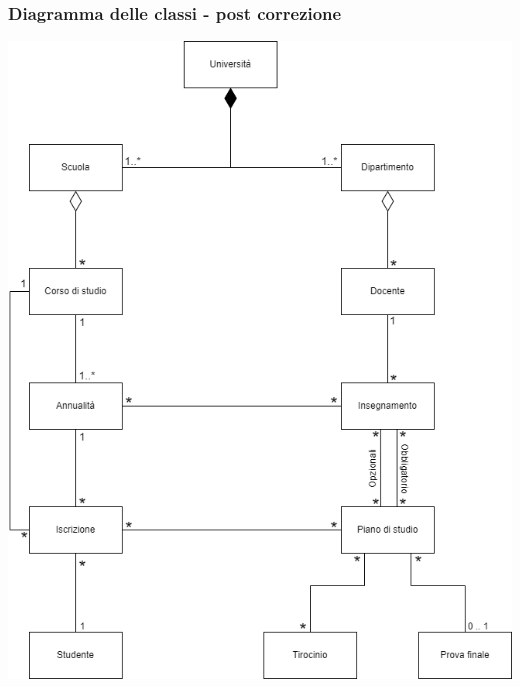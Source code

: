 \documentclass{article}
\begin{document}
\subsubsection*{Diagramma delle classi - post correzione}\vspace*{27pt}
\begin{center}
    \includegraphics[width=1.02\textwidth]{foto 3.png}
\end{center}
\pagebreak
\end{document}
